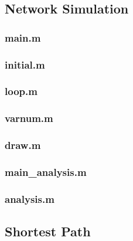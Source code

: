 \documentclass[11pt]{scrartcl}
\begin{document}
\subsection{Network Simulation}
\label{sec:network_simulation}

\subsubsection{main.m}



\null
\null

\subsubsection{initial.m}



\null
\null

\subsubsection{loop.m}



\null
\null

\subsubsection{varnum.m}



\null
\null

\subsubsection{draw.m}



\null
\null

\newpage
\subsubsection{main\_analysis.m}



\null
\null

\subsubsection{analysis.m}



\null
\null

\subsection{Shortest Path}
\label{sec:shortest_path}









\end{document}

